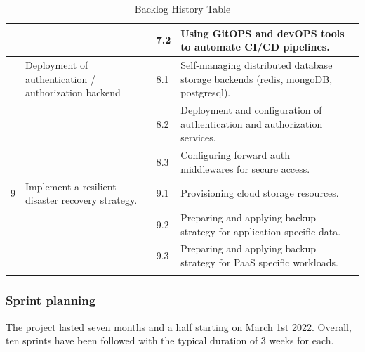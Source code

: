 \begin{longtable}[H]{|m{1cm}|m{3cm}|m{1cm}|m{7cm}|m{1.2cm}|}
\cline{3-5}
&   & 7.2 &	 \raggedright Using GitOPS and devOPS tools to automate CI/CD pipelines.	 & \\
\hline
\pagebreak
\hline
8 & \raggedright Deployment of authentication / authorization backend 	& 8.1 & \raggedright Self-managing distributed database storage backends (redis, mongoDB, postgresql).	 & \\
\cline{3-5}
&   & 8.2 &	\raggedright Deployment and configuration of authentication and authorization services.	 & \\
\cline{3-5}
&   & 8.3 &	\raggedright Configuring forward auth middlewares for secure access.	 & \\
   \hline
9 & \raggedright Implement a resilient disaster recovery strategy. & 9.1 &\raggedright  Provisioning cloud storage resources.		 & \\
\cline{3-5}
&   & 9.2 & \raggedright Preparing and applying backup strategy for application specific data.	 & \\
\cline{3-5}
&   & 9.3 &	\raggedright Preparing and applying backup strategy for PaaS specific workloads.	 & \\
 \hline
\caption{ Backlog History Table }
\end{longtable}


\newpage
\subsubsection{Sprint planning }
The project lasted seven months and a half starting on March 1st 2022. Overall, ten sprints have been followed with the typical duration of 3 weeks for each. 


